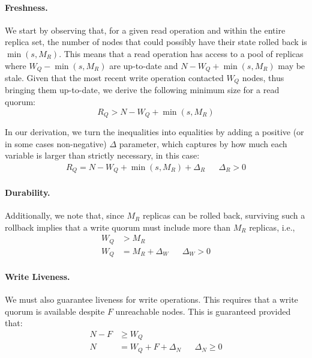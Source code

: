 \paragraph{Freshness.}

We start by observing that, for a given read operation and within
the entire replica set, the number of nodes that could possibly
have their state rolled back is $\min(s, M_R)$. This means that a
read operation has access to a pool of replicas where $W_Q -
\min(s, M_R)$ are up-to-date and $N - W_Q + \min(s, M_R)$ may be
stale. Given that the most recent write operation contacted $W_Q$
nodes, thus bringing them up-to-date, we derive the following
minimum size for a read quorum:
\begin{equation} \label{eq:inters}
  R_Q > N - W_Q + \min(s, M_R)
\end{equation}

In our derivation, we turn the inequalities into equalities by
adding a positive (or in some cases non-negative) $\Delta$
parameter, which captures by how much each variable is larger
than strictly necessary, in this case:
\begin{align} \label{eq:inters2}
  R_Q = N - W_Q + \min(s, M_R) + \Delta_R && \Delta_R > 0
\end{align}

\paragraph{Durability.}

Additionally, we note that, since $M_R$ replicas can be rolled
back, surviving such a rollback implies that a write quorum must
include more than $M_R$ replicas, i.e.,
\begin{align}
    W_Q &> M_R \nonumber \\
    W_Q &= M_R + \Delta_W && \Delta_W > 0 \label{eq:fresh}
\end{align}

\paragraph{Write Liveness.}
We must also guarantee liveness for write operations. This
requires that a write quorum is available despite $F$ unreachable
nodes. This is guaranteed provided that:
\begin{align}
    N - F &\geq W_Q \nonumber \\
    N &= W_Q + F + \Delta_N && \Delta_N \geq 0  \label{eq:Wavail}
\end{align}


